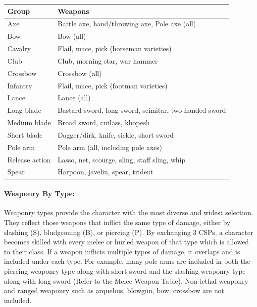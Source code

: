 \begin{multicols}{2}
\begin{minipage}{\columnwidth}
\label{weapongroups}
\noindent
\begin{tabular}{|p{}|p{}|}
\hline
Group	& Weapons \\
\hline\hline
\rowcolor[gray]{.9}Axe				& Battle axe, hand/throwing axe, Pole axe (all) \\
Bow				& Bow (all) \\
\rowcolor[gray]{.9}Cavalry			& Flail, mace, pick (horseman varieties) \\
Club			& Club, morning star, war hammer \\
\rowcolor[gray]{.9}Crossbow		& Crossbow (all) \\
Infantry		& Flail, mace, pick (footman varieties) \\
\rowcolor[gray]{.9}Lance			& Lance (all) \\
Long blade		& Bastard sword, long sword, scimitar, two-handed sword \\
\rowcolor[gray]{.9}Medium blade	& Broad sword, cutlass, khopesh  \\
Short blade		& Dagger/dirk, knife, sickle, short sword \\
\rowcolor[gray]{.9}Pole arm		& Pole arm (all, including pole axes) \\
Release action	& Lasso, net, scourge, sling, staff sling, whip \\
\rowcolor[gray]{.9}Spear			& Harpoon, javelin, spear, trident \\
\hline
\end{tabular}

\end{minipage}

\paragraph{Weaponry By Type:} Weaponry types provide the character with the most diverse and widest selection.  They reflect those weapons that inflict the same type of damage, either by slashing (S), bludgeoning (B), or piercing (P).  By exchanging 3 CSPs, a character becomes skilled with every melee or hurled weapon of that type which is allowed to their class.  If a weapon inflicts multiple types of damage, it overlaps and is included under each type.  For example, many pole arms are included in both the piercing weaponry type along with short sword and the slashing weaponry type along with long sword (Refer to the Melee Weapon Table).  Non-lethal weaponry and ranged weaponry such as arquebus, blowgun, bow, crossbow are not included.


\end{multicols}
